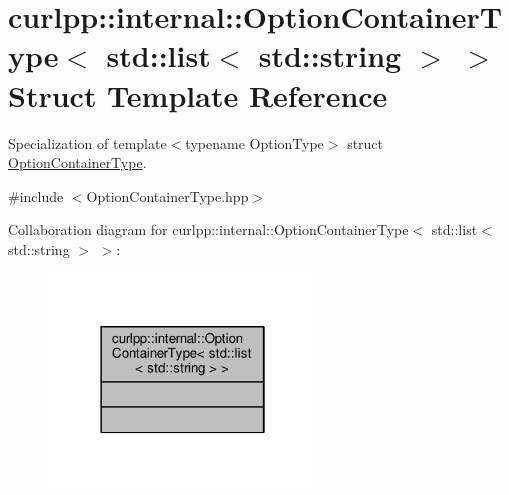 \hypertarget{structcurlpp_1_1internal_1_1OptionContainerType_3_01std_1_1list_3_01std_1_1string_01_4_01_4}{\section{curlpp\-:\-:internal\-:\-:Option\-Container\-Type$<$ std\-:\-:list$<$ std\-:\-:string $>$ $>$ Struct Template Reference}
\label{structcurlpp_1_1internal_1_1OptionContainerType_3_01std_1_1list_3_01std_1_1string_01_4_01_4}
}


Specialization of template$<$typename Option\-Type$>$ struct \hyperlink{structcurlpp_1_1internal_1_1OptionContainerType}{Option\-Container\-Type}.  




{\ttfamily \#include $<$Option\-Container\-Type.\-hpp$>$}



Collaboration diagram for curlpp\-:\-:internal\-:\-:Option\-Container\-Type$<$ std\-:\-:list$<$ std\-:\-:string $>$ $>$\-:\nopagebreak
\begin{figure}[H]
\begin{center}
\leavevmode
\includegraphics[width=202pt]{structcurlpp_1_1internal_1_1OptionContainerType_3_01std_1_1list_3_01std_1_1string_01_4_01_4__coll__graph}
\end{center}
\end{figure}
